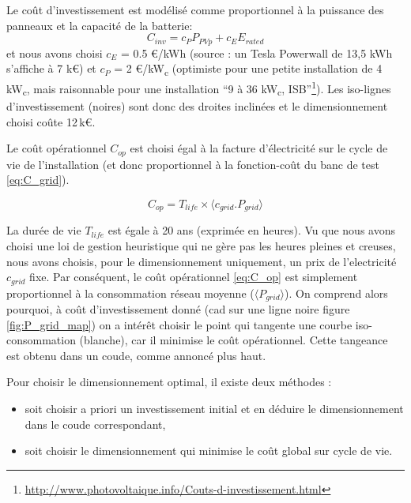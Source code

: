 \documentclass[a4paper,10pt,twocolumn]{article}
\providecommand{\avg}[1]{\langle#1\rangle}
\newcommand\sub[1]{\textsubscript{#1}}
\newcommand\kWc{kW\sub{c}{}} %
\begin{document}
Le coût d'investissement est modélisé comme proportionnel à la puissance
des panneaux et la capacité de la batterie:
%
\begin{equation} \label{eq:C_inv}
  C_{inv} = c_P P_{PVp} + c_E E_{rated}
\end{equation} 
et nous avons choisi $c_E$ = 0.5 €/kWh (source : un Tesla Powerwall de 13,5 kWh s'affiche à 7 k€)
et $c_P$ = 2 €/\kWc{} (optimiste pour une petite installation de 4\,\kWc,
mais raisonnable pour une installation ``9 à 36 \kWc, ISB''\footnote{\url{http://www.photovoltaique.info/Couts-d-investissement.html}}).
Les iso-lignes d'investissement (noires) sont donc des droites inclinées
et le dimensionnement choisi coûte 12\,k€.

Le coût opérationnel $C_{op}$ est choisi égal à la facture d'électricité
sur le cycle de vie de l'installation (et donc proportionnel à la fonction-coût
du banc de test \eqref{eq:C_grid}).

\begin{equation} \label{eq:C_op}
  C_{op} = T_{life} \times \avg{c_{grid}.P_{grid} }
\end{equation} 

La durée de vie $T_{life}$ est égale à 20 ans (exprimée en heures).
Vu que nous avons choisi une loi de gestion heuristique qui ne gère pas les heures pleines et creuses,
nous avons choisis, pour le dimensionnement uniquement, un prix de l'electricité $c_{grid}$ fixe.
Par conséquent, le coût opérationnel \eqref{eq:C_op} est simplement proportionnel à
la consommation réseau moyenne ($\avg{P_{grid}}$).
On comprend alors pourquoi, à coût d'investissement donné (cad sur une ligne noire figure \ref{fig:P_grid_map})
on a intérêt choisir le point qui tangente une courbe iso-consommation (blanche),
car il minimise le coût opérationnel. Cette tangeance est obtenu dans un coude, comme annoncé plus haut.

Pour choisir le dimensionnement optimal, il existe deux méthodes :

\begin{itemize}
 \item soit choisir a priori un investissement initial et en déduire le dimensionnement
 dans le coude correspondant,
 \item soit choisir le dimensionnement qui minimise le coût global sur cycle de vie.
\end{itemize}
\end{document}
